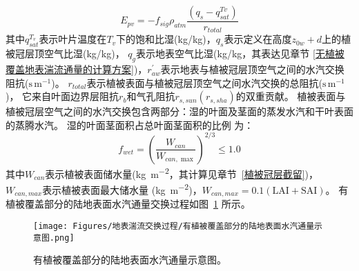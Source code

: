 \begin{equation}
E_{pv}=-f_{sig} \rho_{atm} \frac{\left(q_{s}-q_{s a t}^{T v}\right)}{r_{t o t a l}}
\end{equation}
其中$q_{sat}^{T_v}$表示叶片温度在$T_v$下的饱和比湿(kg/kg)，$q_s$表示定义在高度$z_{0w}+d$上的植被冠层顶空气比湿(kg/kg)，
$q_g$表示地表空气比湿(kg/kg，其表达见章节 \ref{无植被覆盖地表湍流通量的计算方案})，$r_{aw}^\prime$表示地表与植被冠层顶空气之间的水汽交换阻抗($\mathrm{s\,m^{-1}}$)。
$r_{total}$表示植被表面与植被冠层顶空气之间水汽交换的总阻抗($\mathrm{s\,m^{-1}}$)，
它来自叶面边界层阻抗$r_b$和气孔阻抗$r_{s,sun}\left(r_{s,sha}\right)$的双重贡献。
植被表面与植被冠层空气之间的水汽交换包含两部分：湿的叶面及茎面的蒸发水汽和干叶表面的蒸腾水汽。
湿的叶面茎面积占总叶面茎面积的比例 \citep{dickinson1993biosphere} 为：
\begin{equation}
f_{w e t}=\left(\frac{W_{c a n}}{W_{c a n, \max }}\right)^{2 / 3} \leq 1.0
\end{equation}
其中$W_{can}$表示植被表面储水量(\unit{kg.m^{-2}}，其计算见章节~\ref{植被冠层截留})，$W_{can,max}$表示植被表面最大储水量
(\unit{kg.m^{-2}})，$W_{can,max}=0.1\left(\text {LAI}+ \text {SAI}\right)$。
有植被覆盖部分的陆地表面水汽通量交换过程如图~\ref{fig:有植被覆盖部分的陆地表面水汽通量示意图} 所示。
{
\begin{figure}[]
\centering
\texttt{[image: Figures/地表湍流交换过程/有植被覆盖部分的陆地表面水汽通量示意图.png]}
\caption{有植被覆盖部分的陆地表面水汽通量示意图。}
\label{fig:有植被覆盖部分的陆地表面水汽通量示意图}
\end{figure}
}

